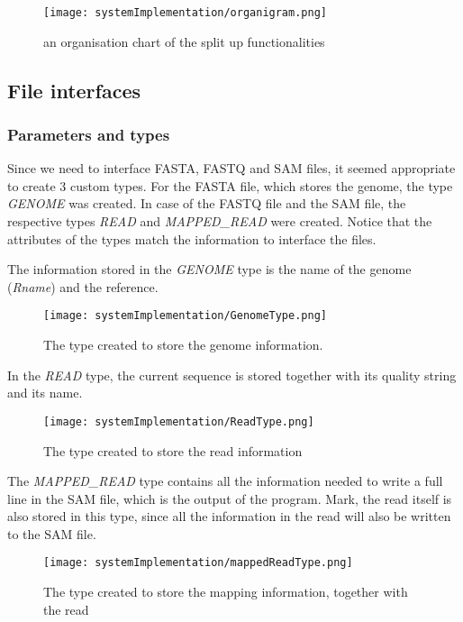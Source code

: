 \begin{figure}[H]
	\centering
	\texttt{[image: systemImplementation/organigram.png]}
	\caption{an organisation chart of the split up functionalities}
	\label{fig:organigram}
\end{figure}

\subsection{File interfaces}

\subsubsection{Parameters and types}

Since we need to interface FASTA, FASTQ and SAM files, it seemed appropriate to create 3 custom types. For the FASTA file, which stores the genome, the type \emph{GENOME} was created. In case of the FASTQ file and the SAM file, the respective types \emph{READ} and \emph{MAPPED\_READ} were created. Notice that the attributes of the types match the information to interface the files.

The information stored in the \emph{GENOME} type is the name of the genome (\emph{Rname}) and the reference.

\begin{figure}[H]
	\centering
	\texttt{[image: systemImplementation/GenomeType.png]}
	\caption{The type created to store the genome information.}
	\label{fig:GenomeType}
\end{figure}

In the \emph{READ} type, the current sequence is stored together with its quality string and its name.

\begin{figure}[H]
	\centering
	\texttt{[image: systemImplementation/ReadType.png]}
	\caption{The type created to store the read information}
	\label{fig:ReadType}
\end{figure}

The \emph{MAPPED\_READ} type contains all the information needed to write a full line in the SAM file, which is the output of the program.
Mark, the read itself is also stored in this type, since all the information in the read will also be written to the SAM file.

\begin{figure}[H]
	\centering
	\texttt{[image: systemImplementation/mappedReadType.png]}
	\caption{The type created to store the mapping information, together with the read}
	\label{fig:mappedReadType}
\end{figure}

